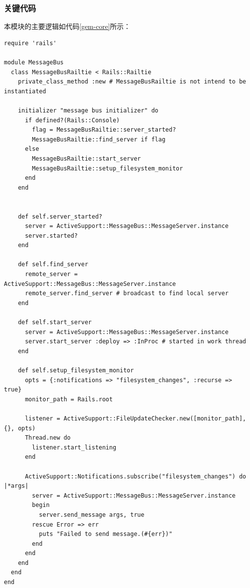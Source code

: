 \subsubsection{关键代码}
本模块的主要逻辑如代码\ref{gem-core}所示：
\begin{lstlisting}[caption={初始化核心代码展示}, label=gem-core]
require 'rails'

module MessageBus
  class MessageBusRailtie < Rails::Railtie
    private_class_method :new # MessageBusRailtie is not intend to be instantiated

    initializer "message bus initializer" do
      if defined?(Rails::Console)
        flag = MessageBusRailtie::server_started?
        MessageBusRailtie::find_server if flag
      else
        MessageBusRailtie::start_server
        MessageBusRailtie::setup_filesystem_monitor
      end
    end


    def self.server_started?
      server = ActiveSupport::MessageBus::MessageServer.instance
      server.started?
    end

    def self.find_server
      remote_server = ActiveSupport::MessageBus::MessageServer.instance
      remote_server.find_server # broadcast to find local server
    end

    def self.start_server
      server = ActiveSupport::MessageBus::MessageServer.instance
      server.start_server :deploy => :InProc # started in work thread
    end

    def self.setup_filesystem_monitor
      opts = {:notifications => "filesystem_changes", :recurse => true}
      monitor_path = Rails.root

      listener = ActiveSupport::FileUpdateChecker.new([monitor_path], {}, opts)
      Thread.new do
        listener.start_listening
      end

      ActiveSupport::Notifications.subscribe("filesystem_changes") do |*args|
        server = ActiveSupport::MessageBus::MessageServer.instance
        begin
          server.send_message args, true
        rescue Error => err
          puts "Failed to send message.(#{err})"
        end
      end
    end
  end
end
\end{lstlisting}








